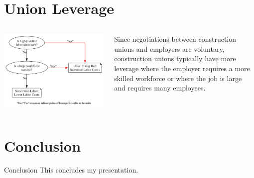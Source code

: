 \documentclass{beamer}
\begin{document}
\section{Union Leverage}
\begin{frame} %
  \begin{columns}
    \includegraphics[width=\linewidth]{../images/union_power_red}

    Since negotiations between construction unions and employers are voluntary, construction unions typically have more leverage where the employer requires a more skilled workforce or where the job is large and requires many employees.
  \end{columns}
\end{frame}

\section{Conclusion}
\begin{frame}{Conclusion}
  This concludes my presentation.
\end{frame}
\end{document}

